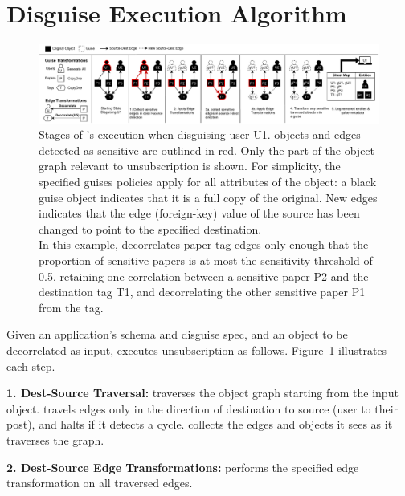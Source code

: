 \section{Disguise Execution Algorithm}

\begin{figure}[ht!]
    \centering
    \includegraphics[width=\textwidth]{img/algo}

    \caption{Stages of \sys's execution when disguising user U1. objects and edges detected as
    sensitive are outlined in red. Only the part of the object graph relevant to unsubscription is shown.
    For simplicity, the specified guises policies apply for all attributes
    of the object: a black guise object indicates that it is a full copy of the original.
    New edges indicates that the edge (foreign-key) value of the source has been changed to
    point to the specified destination.\\
    In this example, \sys decorrelates paper-tag edges only enough that the proportion of sensitive papers
    is at most the sensitivity threshold of 0.5, retaining one correlation between a sensitive
    paper P2 and the destination tag T1, and decorrelating the other sensitive paper P1 from the tag.}
    \label{fig:algo}
\end{figure}

Given an application's schema and disguise spec, and an object to be decorrelated as input,
\sys executes unsubscription as follows. Figure~\ref{fig:algo} illustrates each step.
    
    \vspace{0.5\baselineskip}\noindent\textbf{1. Dest-Source Traversal:} 
        \sys traverses the object graph starting from the input object. \sys travels edges only in
        the direction of destination to source (\eg user to their post), and halts if it detects a
        cycle.
        \sys collects the edges and objects it sees as it traverses the graph.

    \vspace{0.5\baselineskip}\noindent\textbf{2. Dest-Source Edge Transformations:}
        \sys performs the specified edge transformation on all traversed edges.
     
